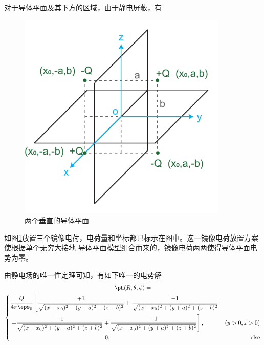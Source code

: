     对于导体平面及其下方的区域，由于静电屏蔽，有


    \begin{figure}[htbp]
        \centering
        \includegraphics[width=10cm]{img/2.1/电像法2.pdf}
        \caption{两个垂直的导体平面}
        \label{2.1_fig:电像法2}
    \end{figure}
    
    如图\ref{2.1_fig:电像法2}放置三个镜像电荷，电荷量和坐标都已标示在图中。这一镜像电荷放置方案使根据单个无穷大接地 导体平面模型组合而来的，镜像电荷两两使得导体平面电势为零。
    
    由静电场的唯一性定理可知，有如下唯一的电势解
    \begin{multline}
        \ph(R,\theta,\phi)=\\
        \left\{
        \begin{aligned}
        	&\frac{Q}{4\pi\eps_0}
        	\left[ 
        	    \frac{+1}{\sqrt{(x-x_0)^2+(y-a)^2+(z-b)^2}}
        	    +\frac{-1}{\sqrt{(x-x_0)^2+(y+a)^2+(z-b)^2}}\right.&  \\
        	    &\left.+\frac{-1}{\sqrt{(x-x_0)^2+(y-a)^2+(z+b)^2}}
        	    +\frac{+1}{\sqrt{(x-x_0)^2+(y+a)^2+(z+b)^2}}
        	\right],
        	&(y>0,z>0)\\
        	& \qquad\qquad\qquad\qquad\qquad\qquad\qquad\qquad 0, &
        	\mathrm{else}
    	\end{aligned}
        \right.
    \end{multline}
    

